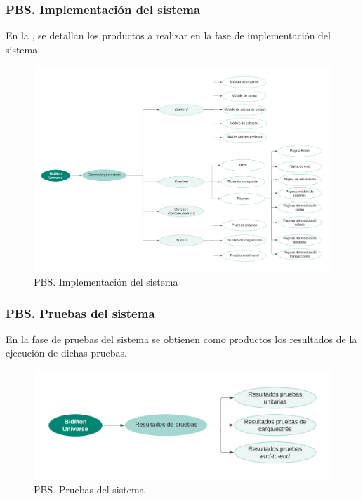 \subsubsection{PBS. Implementación del sistema}
En la , se detallan los productos a realizar en la fase de implementación del sistema.
\begin{figure}[H]
    \hypertarget{fig:5_PBS-Implementación-Sistema}{}
    \centering
    \includegraphics[width=0.9\linewidth]{figures/5-PBS/5_PBS-Implementacion.png}
    \caption{PBS. Implementación del sistema}
    \label{fig:5_PBS-Implementación-Sistema}
\end{figure}

\subsubsection{PBS. Pruebas del sistema}
En la fase de pruebas del sistema se obtienen como productos los resultados de la ejecución de dichas pruebas.
\begin{figure}[H]
    \hypertarget{fig:5_PBS-Pruebas}{}
    \centering
    \includegraphics[width=0.7\linewidth]{figures/5-PBS/5_PBS-Pruebas.png}
    \caption{PBS. Pruebas del sistema}
    \label{fig:5_PBS-Pruebas}
\end{figure}

